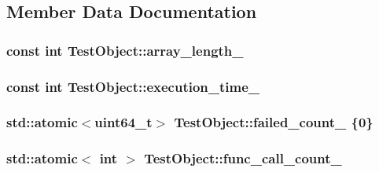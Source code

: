 \subsection{Member Data Documentation}
\hypertarget{class_test_object_a3ecf0e2547599d03b0f51f2b3360dfe9}{}
\subsubsection[{array\+\_\+length\+\_\+}]{\setlength{\rightskip}{0pt plus 5cm}const int Test\+Object\+::array\+\_\+length\+\_\+}\label{class_test_object_a3ecf0e2547599d03b0f51f2b3360dfe9}
\hypertarget{class_test_object_a793d9a604b2aba56deb74988227b79da}{}
\subsubsection[{execution\+\_\+time\+\_\+}]{\setlength{\rightskip}{0pt plus 5cm}const int Test\+Object\+::execution\+\_\+time\+\_\+}\label{class_test_object_a793d9a604b2aba56deb74988227b79da}
\hypertarget{class_test_object_ac35fa7f931e815c17dc672d2bc157a50}{}
\subsubsection[{failed\+\_\+count\+\_\+}]{\setlength{\rightskip}{0pt plus 5cm}std\+::atomic$<$uint64\+\_\+t$>$ Test\+Object\+::failed\+\_\+count\+\_\+ \{0\}}\label{class_test_object_ac35fa7f931e815c17dc672d2bc157a50}
\hypertarget{class_test_object_ad94d908ecb400ec8d82cb566bcdd4565}{}
\subsubsection[{func\+\_\+call\+\_\+count\+\_\+}]{\setlength{\rightskip}{0pt plus 5cm}std\+::atomic$<$ int $>$ Test\+Object\+::func\+\_\+call\+\_\+count\+\_\+}\label{class_test_object_ad94d908ecb400ec8d82cb566bcdd4565}
\hypertarget{class_test_object_ad069dbfc17e738bda7f5ef0a976aab30}{}

